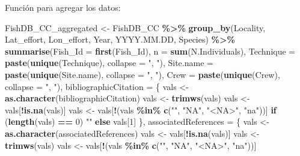 \documentclass[sn-apa,pdflatex]{sn-jnl}
\newenvironment{Shaded}{\begin{snugshade}}{\end{snugshade}}
\newcommand{\AttributeTok}[1]{\textcolor[rgb]{0.13,0.29,0.53}{#1}}
\newcommand{\ControlFlowTok}[1]{\textcolor[rgb]{0.13,0.29,0.53}{\textbf{#1}}}
\newcommand{\DecValTok}[1]{\textcolor[rgb]{0.00,0.00,0.81}{#1}}
\newcommand{\FunctionTok}[1]{\textcolor[rgb]{0.13,0.29,0.53}{\textbf{#1}}}
\newcommand{\NormalTok}[1]{#1}
\newcommand{\OtherTok}[1]{\textcolor[rgb]{0.56,0.35,0.01}{#1}}
\newcommand{\SpecialCharTok}[1]{\textcolor[rgb]{0.81,0.36,0.00}{\textbf{#1}}}
\newcommand{\StringTok}[1]{\textcolor[rgb]{0.31,0.60,0.02}{#1}}
\begin{document}
Función para agregar los datos:

\begin{Shaded}
\begin{Highlighting}[]
\NormalTok{FishDB\_CC\_aggregated }\OtherTok{\textless{}{-}}\NormalTok{ FishDB\_CC }\SpecialCharTok{\%\textgreater{}\%}
    \FunctionTok{group\_by}\NormalTok{(Locality, Lat\_effort, Lon\_effort, Year, YYYY.MM.DD,}
\NormalTok{        Species) }\SpecialCharTok{\%\textgreater{}\%}
    \FunctionTok{summarise}\NormalTok{(}\AttributeTok{Fish\_Id =} \FunctionTok{first}\NormalTok{(Fish\_Id), }\AttributeTok{n =} \FunctionTok{sum}\NormalTok{(N.Individuals),}
        \AttributeTok{Technique =} \FunctionTok{paste}\NormalTok{(}\FunctionTok{unique}\NormalTok{(Technique), }\AttributeTok{collapse =} \StringTok{", "}\NormalTok{),}
        \AttributeTok{Site.name =} \FunctionTok{paste}\NormalTok{(}\FunctionTok{unique}\NormalTok{(Site.name), }\AttributeTok{collapse =} \StringTok{", "}\NormalTok{),}
        \AttributeTok{Crew =} \FunctionTok{paste}\NormalTok{(}\FunctionTok{unique}\NormalTok{(Crew), }\AttributeTok{collapse =} \StringTok{", "}\NormalTok{), }\AttributeTok{bibliographicCitation =}\NormalTok{ \{}
\NormalTok{            vals }\OtherTok{\textless{}{-}} \FunctionTok{as.character}\NormalTok{(bibliographicCitation)}
\NormalTok{            vals }\OtherTok{\textless{}{-}} \FunctionTok{trimws}\NormalTok{(vals)}
\NormalTok{            vals }\OtherTok{\textless{}{-}}\NormalTok{ vals[}\SpecialCharTok{!}\FunctionTok{is.na}\NormalTok{(vals)]}
\NormalTok{            vals }\OtherTok{\textless{}{-}}\NormalTok{ vals[}\SpecialCharTok{!}\NormalTok{(vals }\SpecialCharTok{\%in\%} \FunctionTok{c}\NormalTok{(}\StringTok{""}\NormalTok{, }\StringTok{"NA"}\NormalTok{, }\StringTok{"\textless{}NA\textgreater{}"}\NormalTok{, }\StringTok{"na"}\NormalTok{))]}
            \ControlFlowTok{if}\NormalTok{ (}\FunctionTok{length}\NormalTok{(vals) }\SpecialCharTok{==} \DecValTok{0}\NormalTok{)}
                \StringTok{""} \ControlFlowTok{else}\NormalTok{ vals[}\DecValTok{1}\NormalTok{]}
\NormalTok{        \}, }\AttributeTok{associatedReferences =}\NormalTok{ \{}
\NormalTok{            vals }\OtherTok{\textless{}{-}} \FunctionTok{as.character}\NormalTok{(associatedReferences)}
\NormalTok{            vals }\OtherTok{\textless{}{-}}\NormalTok{ vals[}\SpecialCharTok{!}\FunctionTok{is.na}\NormalTok{(vals)]}
\NormalTok{            vals }\OtherTok{\textless{}{-}} \FunctionTok{trimws}\NormalTok{(vals)}
\NormalTok{            vals }\OtherTok{\textless{}{-}}\NormalTok{ vals[}\SpecialCharTok{!}\NormalTok{(vals }\SpecialCharTok{\%in\%} \FunctionTok{c}\NormalTok{(}\StringTok{""}\NormalTok{, }\StringTok{"NA"}\NormalTok{, }\StringTok{"\textless{}NA\textgreater{}"}\NormalTok{, }\StringTok{"na"}\NormalTok{))]}

\end{Highlighting}
\end{Shaded}
\end{document}
